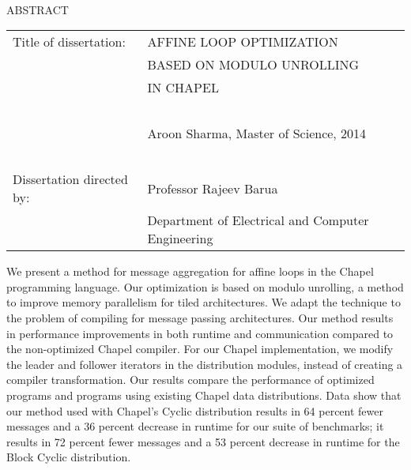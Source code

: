 
\hbox{\ }

\renewcommand{\baselinestretch}{1}
\small \normalsize

\begin{center}
\large{{ABSTRACT}} 

\vspace{3em} 

\end{center}
\hspace{-.15in}
\begin{tabular}{ll}
Title of dissertation:    & {\large  AFFINE LOOP OPTIMIZATION }\\
&				      {\large  BASED ON MODULO UNROLLING} \\
&				      {\large  IN CHAPEL} \\
\ \\
&                          {\large  Aroon Sharma, Master of Science, 2014} \\
\ \\
Dissertation directed by: & {\large  Professor Rajeev Barua} \\
&  				{\large	 Department of Electrical and Computer Engineering } \\
\end{tabular}

\vspace{3em}

\renewcommand{\baselinestretch}{2}
\large \normalsize

We present a method for message aggregation for affine loops in the Chapel programming language. Our optimization is based on modulo unrolling, a method to improve memory parallelism for tiled architectures. We adapt the technique to the problem of compiling for message passing architectures. Our method results in performance improvements in both runtime and communication compared to the non-optimized Chapel compiler. For our Chapel implementation, we modify the leader and follower iterators in the distribution modules, instead of creating a compiler transformation. Our results compare the performance of optimized programs and programs using existing Chapel data distributions. Data show that our method used with Chapel's Cyclic distribution results in 64 percent fewer messages and a 36 percent decrease in runtime for our suite of benchmarks; it results in 72 percent fewer messages and a 53 percent decrease in runtime for the Block Cyclic distribution. 

